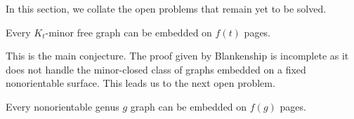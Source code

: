 In this section, we collate the open problems that remain yet to be solved.

\begin{conjecture}
    Every $K_t$-minor free graph can be embedded on $f(t)$ pages.
\end{conjecture}

This is the main conjecture. The proof given by Blankenship is incomplete as it does not handle the minor-closed class of graphs embedded on a fixed nonorientable surface. This leads us to the next open problem.

\begin{conjecture}
    Every nonorientable genus $g$ graph can be embedded on $f(g)$ pages.
\end{conjecture}

